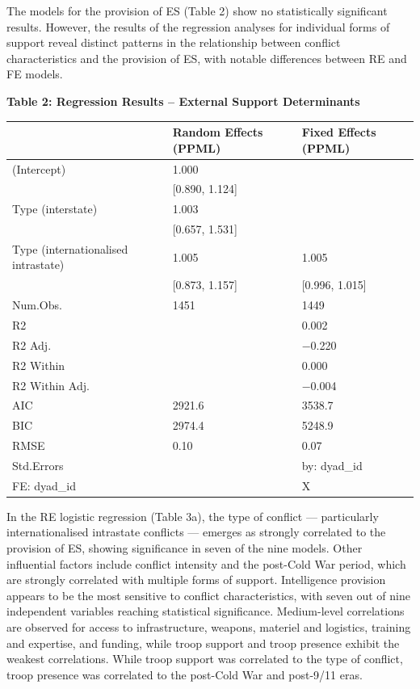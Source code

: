\documentclass[
]{article}
\begin{document}
The models for the provision of ES (Table 2) show no statistically
significant results. However, the results of the regression analyses for
individual forms of support reveal distinct patterns in the relationship
between conflict characteristics and the provision of ES, with notable
differences between RE and FE models.

\newpage

\noindent\textbf{Table 2: Regression Results – External Support Determinants}

\begin{tabular}{lll}
\hline
& Random Effects (PPML) & Fixed Effects (PPML) \\ \hline
(Intercept) & \num{1.000} &  \\
& [\num{0.890}, \num{1.124}] &  \\
Type (interstate) & \num{1.003} &  \\
& [\num{0.657}, \num{1.531}] &  \\
Type (internationalised intrastate) & \num{1.005} & \num{1.005} \\
& [\num{0.873}, \num{1.157}] & [\num{0.996}, \num{1.015}] \\
Num.Obs. & \num{1451} & \num{1449} \\
R2 &  & \num{0.002} \\
R2 Adj. &  & \num{-0.220} \\
R2 Within &  & \num{0.000} \\
R2 Within Adj. &  & \num{-0.004} \\
AIC & \num{2921.6} & \num{3538.7} \\
BIC & \num{2974.4} & \num{5248.9} \\
RMSE & \num{0.10} & \num{0.07} \\
Std.Errors &  & by: dyad\_id \\
FE: dyad\_id &  & X \\
\hline
\end{tabular}

In the RE logistic regression (Table 3a), the type of conflict ---
particularly internationalised intrastate conflicts --- emerges as
strongly correlated to the provision of ES, showing significance in
seven of the nine models. Other influential factors include conflict
intensity and the post-Cold War period, which are strongly correlated
with multiple forms of support. Intelligence provision appears to be the
most sensitive to conflict characteristics, with seven out of nine
independent variables reaching statistical significance. Medium-level
correlations are observed for access to infrastructure, weapons,
materiel and logistics, training and expertise, and funding, while troop
support and troop presence exhibit the weakest correlations. While troop
support was correlated to the type of conflict, troop presence was
correlated to the post-Cold War and post-9/11 eras.
\end{document}
